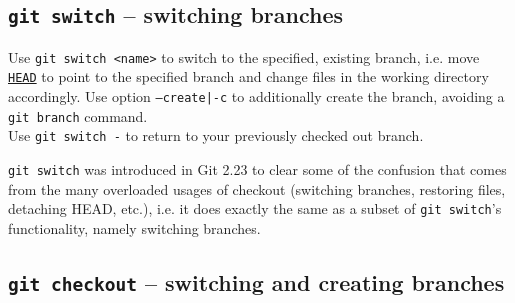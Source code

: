 \documentclass[table, xcdraw]{article}%
\begin{document}
\subsection{\texttt{git switch} -- switching branches} \label{switch}

Use \texttt{git switch <name>} to switch to the specified, existing branch, i.e. move \hyperref[branching]{\texttt{HEAD}} to point to the specified branch and change files in the working directory accordingly. Use option \texttt{--create|-c} to additionally create the branch, avoiding a \texttt{git branch} command.\\
Use \texttt{git switch -} to return to your previously checked out branch.

\texttt{git switch} was introduced in Git 2.23 to clear some of the confusion that comes from the many overloaded usages of checkout (switching branches, restoring files, detaching HEAD, etc.), i.e. it does exactly the same as a subset of \texttt{git switch}'s functionality, namely switching branches.

\subsection{\texttt{git checkout} -- switching and creating branches} \label{checkout}
\end{document}
